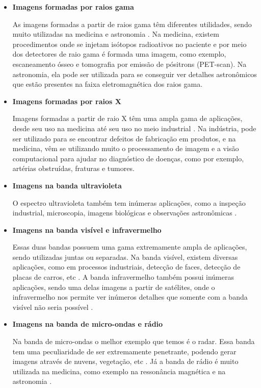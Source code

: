 \documentclass[
  brazilian,
]{book}
\begin{document}
\begin{itemize}
\item
  \textbf{Imagens formadas por raios gama}

  As imagens formadas a partir de raios gama têm diferentes utilidades, sendo muito utilizadas na medicina e astronomia \autocite[p.~6]{gonzalez2010}. Na medicina, existem procedimentos onde se injetam isótopos radioativos no paciente e por meio dos detectores de raio gama é formada uma imagem, como exemplo, escaneamento ósseo e tomografia por emissão de pósitrons (PET-scan). Na astronomia, ela pode ser utilizada para se conseguir ver detalhes astronômicos que estão presentes na faixa eletromagnética dos raios gama.
\item
  \textbf{Imagens formadas por raios X}

  Imagens formadas a partir de raio X têm uma ampla gama de aplicações, desde seu uso na medicina até seu uso no meio industrial \autocite[p.~6]{gonzalez2010}. Na indústria, pode ser utilizado para se encontrar defeitos de fabricação em produtos, e na medicina, vêm se utilizando muito o processamento de imagem e a visão computacional para ajudar no diagnóstico de doenças, como por exemplo, artérias obstruídas, fraturas e tumores.
\item
  \textbf{Imagens na banda ultravioleta}

  O espectro ultravioleta também tem inúmeras aplicações, como a inspeção industrial, microscopia, imagens biológicas e observações astronômicas \autocite[p.~8]{gonzalez2010}.
\item
  \textbf{Imagens na banda visível e infravermelho}

  Essas duas bandas possuem uma gama extremamente ampla de aplicações, sendo utilizadas juntas ou separadas. Na banda visível, existem diversas aplicações, como em processos industriais, detecção de faces, detecção de placas de carros, etc \autocite[p.~11]{gonzalez2010}. A banda infravermelho também possui inúmeras aplicações, sendo uma delas imagens a partir de satélites, onde o infravermelho nos permite ver inúmeros detalhes que somente com a banda visível não seria possível \autocite[p.~9]{gonzalez2010}.
\item
  \textbf{Imagens na banda de micro-ondas e rádio}

  Na banda de micro-ondas o melhor exemplo que temos é o radar. Essa banda tem uma peculiaridade de ser extremamente penetrante, podendo gerar imagens através de nuvens, vegetação, etc \autocite[p.~12]{gonzalez2010}. Já a banda de rádio é muito utilizada na medicina, como exemplo na ressonância magnética e na astronomia \autocite[p.~12]{gonzalez2010}.
\end{itemize}
\end{document}
